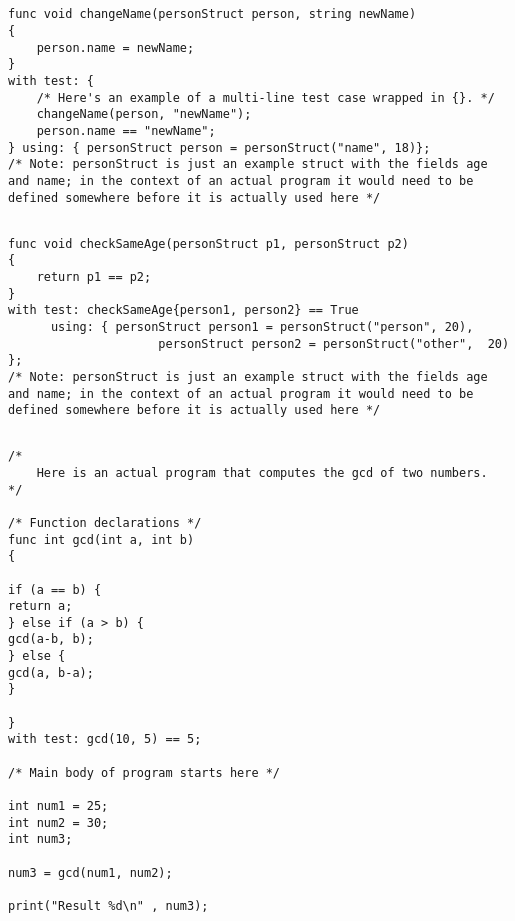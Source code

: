 \documentclass{article}
\begin{document}
\subsection{}
\begin{lstlisting}
func void changeName(personStruct person, string newName)
{
	person.name = newName;
}
with test: {
	/* Here's an example of a multi-line test case wrapped in {}. */
	changeName(person, "newName");
	person.name == "newName";
} using: { personStruct person = personStruct("name", 18)};
/* Note: personStruct is just an example struct with the fields age and name; in the context of an actual program it would need to be defined somewhere before it is actually used here */
\end{lstlisting}


\subsection{}
\begin{lstlisting}
func void checkSameAge(personStruct p1, personStruct p2)
{
	return p1 == p2;
}
with test: checkSameAge{person1, person2} == True
	  using: { personStruct person1 = personStruct("person", 20),
				     personStruct person2 = personStruct("other",  20) };
/* Note: personStruct is just an example struct with the fields age and name; in the context of an actual program it would need to be defined somewhere before it is actually used here */
\end{lstlisting}


\subsection{}
\begin{lstlisting}
/*
	Here is an actual program that computes the gcd of two numbers.
*/

/* Function declarations */
func int gcd(int a, int b)
{

if (a == b) {
return a;
} else if (a > b) {
gcd(a-b, b);
} else {
gcd(a, b-a);
}

}
with test: gcd(10, 5) == 5;

/* Main body of program starts here */

int num1 = 25;
int num2 = 30;
int num3;

num3 = gcd(num1, num2);

print("Result %d\n" , num3);
\end{lstlisting}
\end{document}
